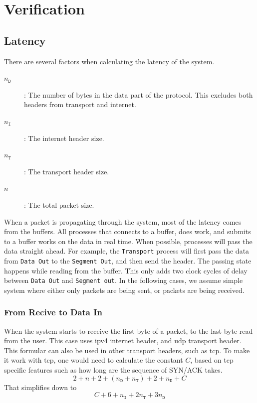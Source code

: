 \section{Verification}
\subsection{Latency}\label{subsec:latency}
There are several factors when calculating the latency of the system.
\begin{description}
    \item[$n_{\mathtt{D}}$]:\quad
    The number of bytes in the data part of the protocol. This excludes both
    headers from transport and internet.
    \item[$n_{\mathtt{I}}$]:\quad
    The internet header size.
    \item[$n_{\mathtt{T}}$]:\quad
    The transport header size.
    \item[$n$]:\quad
    The total packet size.
\end{description}
When a packet is propagating through the system, most
of the latency comes from the buffers. All processes that connects
to a buffer, does work, and submits to a buffer works on the data in real time.
When possible, processes will pass the data straight ahead. For example, the
\texttt{Transport} process will first pass the data from \texttt{Data Out} to
the \texttt{Segment Out}, and then send the header. The passing state happens
while reading from the buffer. This only adds two clock cycles of delay between
\texttt{Data Out} and \texttt{Segment out}.
In the following cases, we assume simple system where either only packets are
being sent, or packets are being received.

\subsubsection{From Recive to Data In}
When the system starts to receive the first byte of a packet, to the last byte read from
the user. This case uses \gls{ipv4} internet header, and \gls{udp} transport
header. This formular can also be used in other transport headers, such as \gls{tcp}.
To make it work with \gls{tcp}, one would need to calculate the constant $C$,
based on \gls{tcp} specific features such as how long are the sequence of
SYN/ACK  takes.
\begin{equation*}
    2 + n + 2 + (n_{\mathtt{D}} + n_{\mathtt{T}}) + 2 + n_{\mathtt{D}}  + C
\end{equation*}
That simplifies down to
\begin{equation} \label{eq:receive_to_datain}
    C + 6 + n_{\mathtt{I}} + 2n_{\mathtt{T}} + 3n_{\mathtt{D}}
\end{equation}
